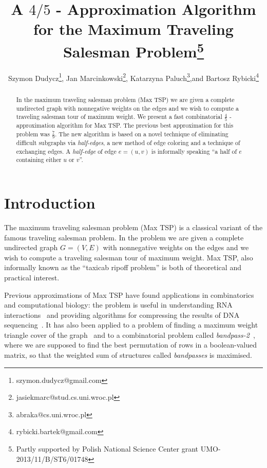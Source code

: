 \documentclass[a4, 11pt]{article}
\title{A $4/5$ - Approximation Algorithm  for the Maximum  Traveling Salesman Problem\thanks{Partly supported by Polish National Science Center grant UMO-2013/11/B/ST6/01748}}
\author{Szymon Dudycz\thanks{szymon.dudycz@gmail.com}, \enskip
		Jan Marcinkowski\thanks{jasiekmarc@stud.cs.uni.wroc.pl}, \enskip 
		Katarzyna Paluch\thanks{abraka@cs.uni.wroc.pl},\enskip and \enskip
		Bartosz Rybicki\thanks{rybicki.bartek@gmail.com}}
\affil{Institute of Computer Science,  University of Wroc{\l}aw}
\date{}
\newcommand{\<}{\langle}
\renewcommand{\>}{\rangle}
\begin{document}
\maketitle
\thispagestyle{empty}
\begin{abstract}
In the maximum  traveling salesman problem (Max TSP)  we are given a complete undirected graph with nonnegative weights on the edges and we wish to compute a traveling salesman tour of maximum weight. We present a fast combinatorial  $\frac 45$ - approximation algorithm for Max TSP.
The previous best approximation for this problem was $\frac 79$. The new algorithm is based on a novel technique of eliminating difficult subgraphs via {\em half-edges}, a new method of edge coloring and a technique of exchanging edges. A {\it half-edge} of edge $e=(u,v)$ is informally speaking ``a half of $e$ containing either $u$ or $v$''.

\end{abstract}

\newpage

\section{Introduction}
The maximum  traveling salesman problem (Max TSP) is a classical variant of the
famous traveling salesman problem. In the problem we are given a complete undirected graph
$G=(V,E)$ with nonnegative weights on the edges and we wish to compute a
traveling salesman tour of maximum weight. Max TSP, also informally known as the ``taxicab
ripoff problem'' is both of theoretical and practical interest.

Previous approximations of  Max
TSP have found applications in combinatorics and computational biology: the problem is useful in understanding RNA
interactions~\cite{RNA} and providing algorithms for compressing the results of
DNA sequencing~\cite{DNASEQ}. It has also been  applied to a problem of finding
a maximum weight triangle cover of the graph~\cite{HRTri} and to a combinatorial
problem called \emph{bandpass-2}~\cite{CW}, where we are supposed to find the
best permutation of rows in a boolean-valued matrix, so that the weighted sum of
structures called \emph{bandpasses} is maximised.
\end{document}
